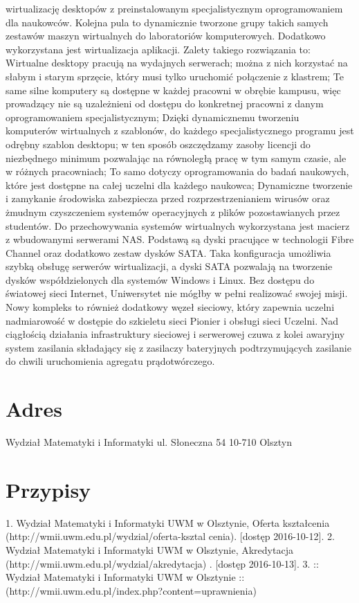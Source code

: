\documentclass[a4paper,12pt]{article}
\begin{document}
wirtualizację desktopów z preinstalowanym specjalistycznym oprogramowaniem dla naukowców. Kolejna pula
to dynamicznie tworzone grupy takich samych zestawów maszyn wirtualnych do laboratoriów
komputerowych. Dodatkowo wykorzystana jest wirtualizacja aplikacji. Zalety takiego rozwiązania to:
Wirtualne desktopy pracują na wydajnych serwerach; można z nich korzystać na słabym i starym
sprzęcie, który musi tylko uruchomić połączenie z klastrem;
Te same silne komputery są dostępne w każdej pracowni w obrębie kampusu, więc prowadzący nie są
uzależnieni od dostępu do konkretnej pracowni z danym oprogramowaniem specjalistycznym;
Dzięki dynamicznemu tworzeniu komputerów wirtualnych z szablonów, do każdego specjalistycznego
programu jest odrębny szablon desktopu; w ten sposób oszczędzamy zasoby licencji do niezbędnego
minimum pozwalając na równoległą pracę w tym samym czasie, ale w różnych pracowniach;
To samo dotyczy oprogramowania do badań naukowych, które jest dostępne na całej uczelni dla każdego
naukowca;
Dynamiczne tworzenie i zamykanie środowiska zabezpiecza przed rozprzestrzenianiem wirusów oraz
żmudnym czyszczeniem systemów operacyjnych z plików pozostawianych przez studentów.
Do przechowywania systemów wirtualnych wykorzystana jest macierz z wbudowanymi serwerami NAS.
Podstawą są dyski pracujące w technologii Fibre Channel oraz dodatkowo zestaw dysków SATA. Taka
konfiguracja umożliwia szybką obsługę serwerów wirtualizacji, a dyski SATA pozwalają na tworzenie dysków
współdzielonych dla systemów Windows i Linux.
Bez dostępu do światowej sieci Internet, Uniwersytet nie mógłby w pełni realizować swojej misji. Nowy
kompleks to również dodatkowy węzeł sieciowy, który zapewnia uczelni nadmiarowość w dostępie do
szkieletu sieci Pionier i obsługi sieci Uczelni. Nad ciągłością działania infrastruktury sieciowej i serwerowej
czuwa z kolei awaryjny system zasilania składający się z zasilaczy bateryjnych podtrzymujących zasilanie do
chwili uruchomienia agregatu prądotwórczego.
\section{Adres}
Wydział Matematyki i Informatyki
ul. Słoneczna 54
10-710 Olsztyn
\section{Przypisy}
1. Wydział Matematyki i Informatyki UWM w Olsztynie, Oferta kształcenia (http://wmii.uwm.edu.pl/wydzial/oferta-ksztal
cenia). [dostęp 2016-10-12].
2. Wydział Matematyki i Informatyki UWM w Olsztynie, Akredytacja (http://wmii.uwm.edu.pl/wydzial/akredytacja) .
[dostęp 2016-10-13].
3. :: Wydział Matematyki i Informatyki UWM w Olsztynie :: (http://wmii.uwm.edu.pl/index.php?content=uprawnienia)
\end{document}
